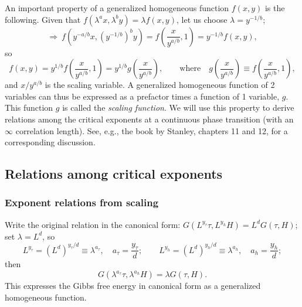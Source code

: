 An important property of a generalized homogeneous function $f(x,y)$ is the following. Given that
$f(\lambda^ax,\lambda^by) = \lambda f(x,y)$, let us choose $\lambda = y^{-1/b}$;
\begin{equation}
  \Rightarrow\ f\left(y^{-a/b}x,(y^{-1/b})^by\right) = f\left(\frac{x}{y^{a/b}},1\right) = y^{-1/b}f(x,y),
\end{equation}
so
\begin{equation}
  f(x,y) = y^{1/b}f\left(\frac{x}{y^{a/b}},1\right) = y^{1/b}g\left(\frac{x}{y^{a/b}}\right),
  \qquad\text{where}\quad g\left(\frac{x}{y^{a/b}}\right)\equiv f\left(\frac{x}{y^{a/b}},1\right),
\end{equation}
and $x/y^{a/b}$ is the scaling variable. A generalized homogeneous function of 2 variables can thus be
expressed as a prefactor times a function of 1 variable, $g$. This function $g$ is called the
\emph{scaling function}. We will use this property to derive relations among the critical exponents at a
continuous phase transition (with an $\infty$ correlation length). See, e.g., the book by Stanley,
chapters 11 and 12, for a corresponding discussion.

\subsection{Relations among critical exponents}\label{sec:exprel}
\subsubsection*{Exponent relations from scaling}

Write the original relation in the canonical form: $G(L^{y_\tau}\tau,L^{y_h}H) = L^dG(\tau,H)$; set
$\lambda = L^d$, so
\begin{equation}
  L^{y_\tau} = (L^d)^{y_\tau/d}\equiv\lambda^{a_\tau},\quad a_\tau = \frac{y_\tau}{d};\qquad
  L^{y_h} = (L^d)^{y_h/d}\equiv\lambda^{a_h},\quad a_h = \frac{y_h}{d};
\end{equation}
then
\begin{equation}\label{eq:Ghom}
  G(\lambda^{a_\tau}\tau,\lambda^{a_h}H) = \lambda G(\tau,H).
\end{equation}
This expresses the Gibbs free energy in canonical form as a generalized homogeneous function.

